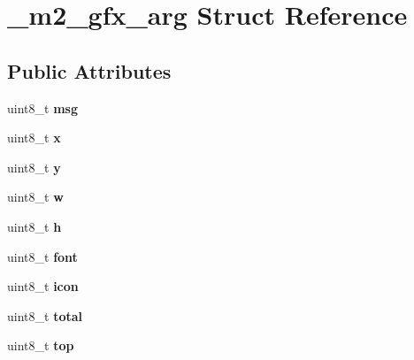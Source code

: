 \hypertarget{struct__m2__gfx__arg}{\section{\-\_\-m2\-\_\-gfx\-\_\-arg Struct Reference}
\label{struct__m2__gfx__arg}
}
\subsection*{Public Attributes}
\begin{DoxyCompactItemize}
\item 
\hypertarget{struct__m2__gfx__arg_a8c02e1d38446482faf2794a816df7089}{uint8\-\_\-t {\bfseries msg}}\label{struct__m2__gfx__arg_a8c02e1d38446482faf2794a816df7089}

\item 
\hypertarget{struct__m2__gfx__arg_af5977c2dce50107d0077d1e1fdcbdc4c}{uint8\-\_\-t {\bfseries x}}\label{struct__m2__gfx__arg_af5977c2dce50107d0077d1e1fdcbdc4c}

\item 
\hypertarget{struct__m2__gfx__arg_a5b8a233f758f29ae167af5dd06d6fd79}{uint8\-\_\-t {\bfseries y}}\label{struct__m2__gfx__arg_a5b8a233f758f29ae167af5dd06d6fd79}

\item 
\hypertarget{struct__m2__gfx__arg_aee04aa74e9fba2c9113b39d326b23969}{uint8\-\_\-t {\bfseries w}}\label{struct__m2__gfx__arg_aee04aa74e9fba2c9113b39d326b23969}

\item 
\hypertarget{struct__m2__gfx__arg_ad60f16bf565c2f17c8451a0de454f403}{uint8\-\_\-t {\bfseries h}}\label{struct__m2__gfx__arg_ad60f16bf565c2f17c8451a0de454f403}

\item 
\hypertarget{struct__m2__gfx__arg_afddb482eb1fab1d1b1466326420420ee}{uint8\-\_\-t {\bfseries font}}\label{struct__m2__gfx__arg_afddb482eb1fab1d1b1466326420420ee}

\item 
\hypertarget{struct__m2__gfx__arg_a9e7a03f578dfd5df1e52361b952bcc21}{uint8\-\_\-t {\bfseries icon}}\label{struct__m2__gfx__arg_a9e7a03f578dfd5df1e52361b952bcc21}

\item 
\hypertarget{struct__m2__gfx__arg_ada6cb63c7e1718d39869f95ac7458d80}{uint8\-\_\-t {\bfseries total}}\label{struct__m2__gfx__arg_ada6cb63c7e1718d39869f95ac7458d80}

\item 
\hypertarget{struct__m2__gfx__arg_a9810e220821fb4d3c1ce159ce44d4a31}{uint8\-\_\-t {\bfseries top}}\label{struct__m2__gfx__arg_a9810e220821fb4d3c1ce159ce44d4a31}


\end{DoxyCompactItemize}
